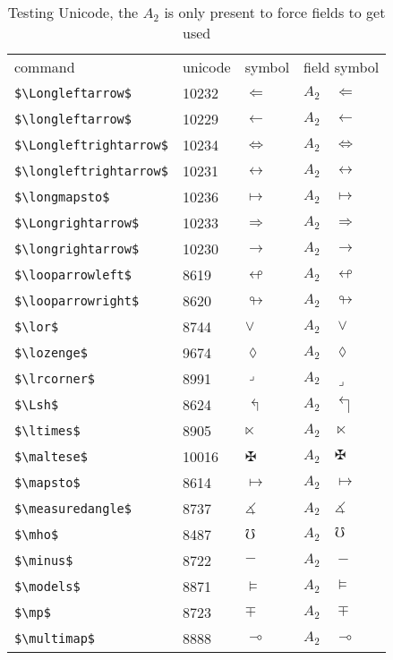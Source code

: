 \documentclass{article}
\begin{document}
\begin{table}
\begin{center}
\begin{tabular}{llll}
 command                    &unicode & symbol                & field symbol\\
 \verb#$\Longleftarrow$#     & 10232 & $\Longleftarrow$      & $A_2\quad \Longleftarrow$\\
 \verb#$\longleftarrow$#     & 10229 & $\longleftarrow$      & $A_2\quad \longleftarrow$\\
 \verb#$\Longleftrightarrow$#& 10234 & $\Longleftrightarrow$ & $A_2\quad \Longleftrightarrow$\\
 \verb#$\longleftrightarrow$#& 10231 & $\longleftrightarrow$ & $A_2\quad \longleftrightarrow$\\
 \verb#$\longmapsto$#        & 10236 & $\longmapsto$         & $A_2\quad \longmapsto$\\
 \verb#$\Longrightarrow$#    & 10233 & $\Longrightarrow$     & $A_2\quad \Longrightarrow$\\
 \verb#$\longrightarrow$#    & 10230 & $\longrightarrow$     & $A_2\quad \longrightarrow$\\
 \verb#$\looparrowleft$#      & 8619 & $\looparrowleft$      & $A_2\quad \looparrowleft$\\
 \verb#$\looparrowright$#     & 8620 & $\looparrowright$     & $A_2\quad \looparrowright$\\
 \verb#$\lor$#                & 8744 & $\lor$                & $A_2\quad \lor$\\
 \verb#$\lozenge$#            & 9674 & $\lozenge$            & $A_2\quad \lozenge$\\
 \verb#$\lrcorner$#           & 8991 & $\lrcorner$           & $A_2\quad \lrcorner$\\
 \verb#$\Lsh$#                & 8624 & $\Lsh$                & $A_2\quad \Lsh$\\
 \verb#$\ltimes$#             & 8905 & $\ltimes$             & $A_2\quad \ltimes$\\
 \verb#$\maltese$#           & 10016 & $\maltese$            & $A_2\quad \maltese$\\
 \verb#$\mapsto$#             & 8614 & $\mapsto$             & $A_2\quad \mapsto$\\
 \verb#$\measuredangle$#      & 8737 & $\measuredangle$      & $A_2\quad \measuredangle$\\
 \verb#$\mho$#                & 8487 & $\mho$                & $A_2\quad \mho$\\
 \verb#$\minus$#              & 8722 & $\minus$              & $A_2\quad \minus$\\
 \verb#$\models$#             & 8871 & $\models$             & $A_2\quad \models$\\
 \verb#$\mp$#                 & 8723 & $\mp$                 & $A_2\quad \mp$\\
 \verb#$\multimap$#           & 8888 & $\multimap$           & $A_2\quad \multimap$\\
\end{tabular}
\end{center}
\caption{Testing Unicode, the $A_2$ is only present to force fields to get used}
\end{table}
\end{document}

